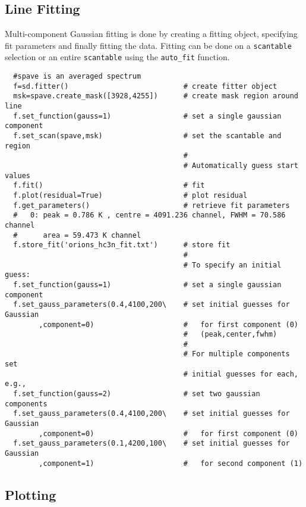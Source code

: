 \subsection{Line Fitting}
\label{subsection:sd.asap.LINEfitting}

Multi-component Gaussian fitting is done by
creating a fitting object, specifying fit parameters and finally
fitting the data. Fitting can be done on a {\tt scantable} selection
or an entire {\tt scantable} using the {\tt auto\_fit} function.

\small
\begin{verbatim}
  #spave is an averaged spectrum
  f=sd.fitter()                           # create fitter object
  msk=spave.create_mask([3928,4255])      # create mask region around line
  f.set_function(gauss=1)                 # set a single gaussian component
  f.set_scan(spave,msk)                   # set the scantable and region
                                          # 
                                          # Automatically guess start values
  f.fit()                                 # fit 
  f.plot(residual=True)                   # plot residual
  f.get_parameters()                      # retrieve fit parameters
  #   0: peak = 0.786 K , centre = 4091.236 channel, FWHM = 70.586 channel
  #      area = 59.473 K channel
  f.store_fit('orions_hc3n_fit.txt')      # store fit
                                          #
                                          # To specify an initial guess:
  f.set_function(gauss=1)                 # set a single gaussian component
  f.set_gauss_parameters(0.4,4100,200\    # set initial guesses for Gaussian
        ,component=0)                     #   for first component (0)
                                          #   (peak,center,fwhm)
                                          #
                                          # For multiple components set
                                          # initial guesses for each, e.g.,
  f.set_function(gauss=2)                 # set two gaussian components
  f.set_gauss_parameters(0.4,4100,200\    # set initial guesses for Gaussian
        ,component=0)                     #   for first component (0)
  f.set_gauss_parameters(0.1,4200,100\    # set initial guesses for Gaussian
        ,component=1)                     #   for second component (1)

\end{verbatim}
\normalsize

\subsection{Plotting}
\label{subsection:sd.asap.plotting}

